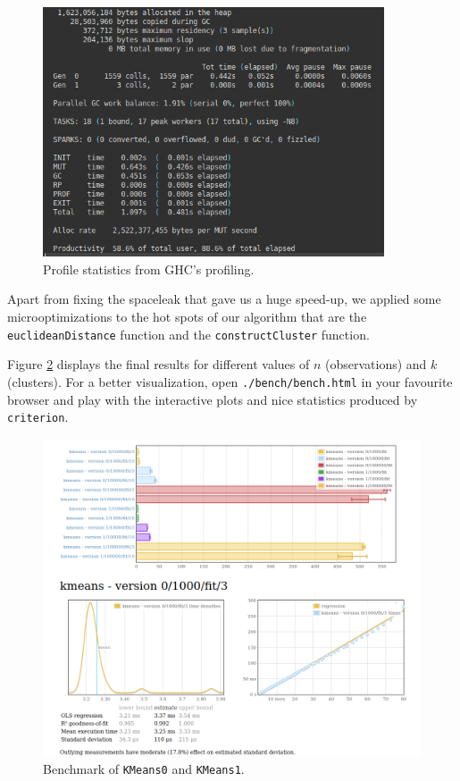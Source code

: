 \documentclass[12pt, a4paper]{article} %
\newcommand{\code}[1]{\texttt{#1}} %
\begin{document}
\begin{figure}[H]
\includegraphics[width=0.9\textwidth]{profile}
\centering
  \caption{Profile statistics from GHC's profiling.}
\label{fig:profile}
\end{figure}

Apart from fixing the spaceleak that gave us a huge speed-up, we applied some microoptimizations to the hot spots of our algorithm that are the \code{euclideanDistance} function and the \code{constructCluster} function.

Figure \ref{fig:bench} displays the final results for different values of $n$ (observations) and $k$ (clusters). For a better visualization, open \code{./bench/bench.html} in your favourite browser and play with the interactive plots and nice statistics produced by \code{criterion}.

\begin{figure}[H]
\includegraphics[width=1\textwidth]{bench}
\centering
  \caption{Benchmark of \code{KMeans0} and \code{KMeans1}.}
\label{fig:bench}
\end{figure}
\end{document}
